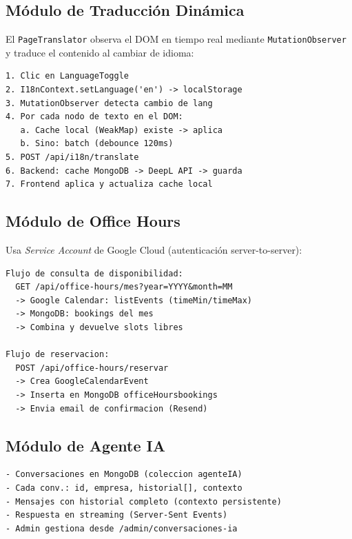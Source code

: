 \documentclass[12pt, a4paper, twoside]{report}
\begin{document}
\subsection{Módulo de Traducción Dinámica}

El \texttt{PageTranslator} observa el DOM en tiempo real mediante \texttt{MutationObserver}
y traduce el contenido al cambiar de idioma:

\begin{tcolorbox}[codebox]
\begin{verbatim}
1. Clic en LanguageToggle
2. I18nContext.setLanguage('en') -> localStorage
3. MutationObserver detecta cambio de lang
4. Por cada nodo de texto en el DOM:
   a. Cache local (WeakMap) existe -> aplica
   b. Sino: batch (debounce 120ms)
5. POST /api/i18n/translate
6. Backend: cache MongoDB -> DeepL API -> guarda
7. Frontend aplica y actualiza cache local
\end{verbatim}
\end{tcolorbox}

\subsection{Módulo de Office Hours}

Usa \textit{Service Account} de Google Cloud (autenticación server-to-server):

\begin{tcolorbox}[codebox]
\begin{verbatim}
Flujo de consulta de disponibilidad:
  GET /api/office-hours/mes?year=YYYY&month=MM
  -> Google Calendar: listEvents (timeMin/timeMax)
  -> MongoDB: bookings del mes
  -> Combina y devuelve slots libres

Flujo de reservacion:
  POST /api/office-hours/reservar
  -> Crea GoogleCalendarEvent
  -> Inserta en MongoDB officeHoursbookings
  -> Envia email de confirmacion (Resend)
\end{verbatim}
\end{tcolorbox}

\subsection{Módulo de Agente IA}

\begin{tcolorbox}[codebox]
\begin{verbatim}
- Conversaciones en MongoDB (coleccion agenteIA)
- Cada conv.: id, empresa, historial[], contexto
- Mensajes con historial completo (contexto persistente)
- Respuesta en streaming (Server-Sent Events)
- Admin gestiona desde /admin/conversaciones-ia
\end{verbatim}
\end{tcolorbox}
\end{document}
